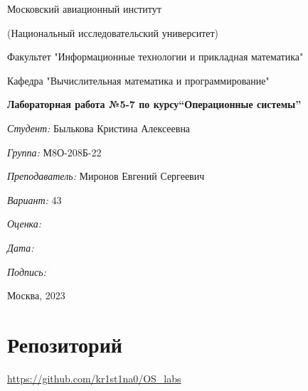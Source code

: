 \documentclass[a4paper, 12pt]{article}
\begin{document}
\thispagestyle{empty}	
\begin{center}
	Московский авиационный институт
	
	(Национальный исследовательский университет)
	
	Факультет "Информационные технологии и прикладная математика"
	
	Кафедра "Вычислительная математика и программирование"
	
\end{center}
\vspace{40ex}
\begin{center}
	\textbf{\large{Лабораторная работа №5-7 по курсу\linebreak \textquotedblleft Операционные системы\textquotedblright}}
\end{center}
\vspace{35ex}
\begin{flushright}
	\textit{Студент: } Былькова Кристина Алексеевна
	
	\vspace{2ex}
	\textit{Группа: } М8О-208Б-22
	
	\vspace{2ex}
	\textit{Преподаватель: } Миронов Евгений Сергеевич
	
	\vspace{2ex}
	\textit{Вариант: } 43
	
	\vspace{2ex}
	\textit{Оценка: } \underline{\quad\quad\quad\quad\quad\quad}
	
	 \vspace{2ex}
	\textit{Дата: } \underline{\quad\quad\quad\quad\quad\quad}
	
	\vspace{2ex}
	\textit{Подпись: } \underline{\quad\quad\quad\quad\quad\quad}
	
\end{flushright}

\vspace{5ex}

\begin{vfill}
	\begin{center}
		Москва, 2023
	\end{center}	
\end{vfill}
\newpage

\begingroup
\color{black}
\tableofcontents\newpage
\endgroup

\section{Репозиторий}
\href{https://github.com/kr1st1na0/OS\_labs}{https://github.com/kr1st1na0/OS\_labs}
\end{document}
